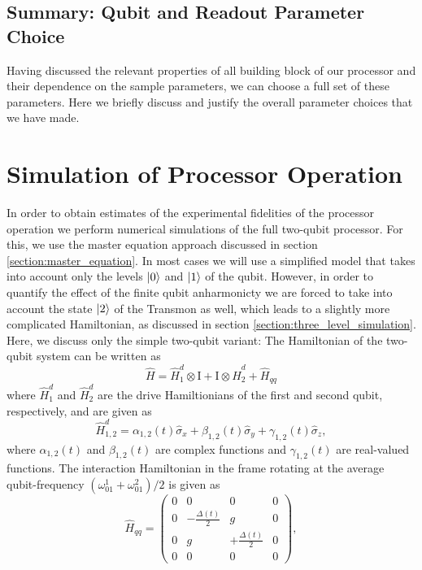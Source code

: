 \subsection{Summary: Qubit and Readout Parameter Choice}

Having discussed the relevant properties of all building block of our processor and their dependence on the sample parameters, we can choose a full set of these parameters. Here we briefly discuss and justify the overall parameter choices that we have made.



\section{Simulation of Processor Operation}

In order to obtain estimates of the experimental fidelities of the processor operation we perform numerical simulations of the full two-qubit processor. For this, we use the master equation approach discussed in section \ref{section:master_equation}. In most cases we will use a simplified model that takes into account only the levels $\left| 0 \right>$ and $\left| 1 \right>$ of the qubit. However, in order to quantify the effect of the finite qubit anharmonicty we are forced to take into account the state $\left| 2 \right>$ of the Transmon as well, which leads to a slightly more complicated Hamiltonian, as discussed in section \ref{section:three_level_simulation}. Here, we discuss only the simple two-qubit variant: The Hamiltonian of the two-qubit system can be written as
%
\begin{equation}
\hat{H} = \hat{H}_1^d\otimes\mathrm{I}+\mathrm{I}\otimes\hat{H}_2^d+\hat{H}_{qq} \label{eq:two_qubit_hamiltonian}
\end{equation}
%
where $\hat{H}_1^d$ and $\hat{H}_2^d$ are the drive Hamiltionians of the first and second qubit, respectively, and are given as
%
\begin{equation}
\hat{H}_{1,2}^d = \alpha_{1,2}(t)\hat{\sigma}_x+\beta_{1,2}(t)\hat{\sigma}_y+\gamma_{1,2}(t)\hat{\sigma}_z,
\end{equation}
%
where $\alpha_{1,2}(t)$ and $\beta_{1,2}(t)$ are complex functions and $\gamma_{1,2}(t)$ are real-valued functions. The interaction Hamiltonian in the frame rotating at the average qubit-frequency $(\omega_{01}^1+\omega_{01}^2)/2$ is given as
%
\begin{equation}
\hat{H}_{qq} = \left(\begin{array}{cccc}0 & 0 & 0 & 0 \\ 0 & -\frac{\Delta(t)}{2} & g & 0 \\ 0 & g & +\frac{\Delta(t)}{2} & 0 \\ 0 & 0 & 0 & 0 \end{array}\right),
\end{equation}
